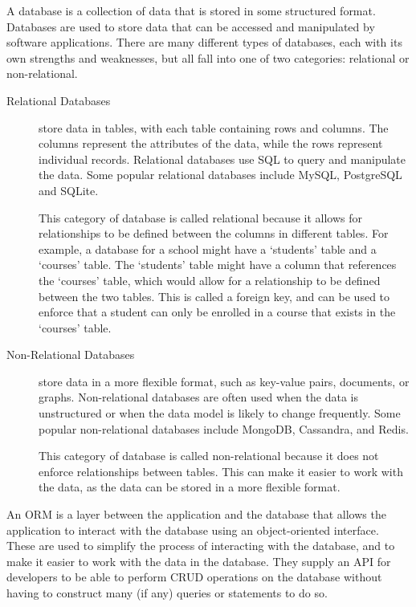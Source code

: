 \documentclass[11pt, a4paper,twoside]{report}
\theoremstyle{plain} %
\theoremstyle{definition} %
\numberwithin{equation}{chapter}
\begin{document}
A database is a collection of data that is stored in some structured
format. Databases are used to store data that can be accessed and
manipulated by software applications. There are many different types of
databases, each with its own strengths and weaknesses, but all fall into
one of two categories: relational or non-relational.

\begin{description}

    \item[Relational Databases] {
        store data in tables, with each table containing rows and columns. The
        columns represent the attributes of the data, while the rows represent
        individual records. Relational databases use SQL to query and
        manipulate the data. Some popular relational databases include MySQL,
        PostgreSQL and SQLite.

        This category of database is called relational because it allows for
        relationships to be defined between the columns in different tables.
        For example, a database for a school might have a `students' table and
        a `courses' table. The `students' table might have a column that
        references the `courses' table, which would allow for a relationship
        to be defined between the two tables. This is called a foreign key, and
        can be used to enforce that a student can only be enrolled in a course
        that exists in the `courses' table.
        }

    \item[Non-Relational Databases] {
        store data in a more flexible format, such as key-value pairs,
        documents, or graphs. Non-relational databases are often used when the
        data is unstructured or when the data model is likely to change
        frequently. Some popular non-relational databases include MongoDB,
        Cassandra, and Redis.

        This category of database is called non-relational because it does not
        enforce relationships between tables. This can make it easier to work
        with the data, as the data can be stored in a more flexible format.

        }

\end{description}

An ORM is a layer between the application and the database that allows the
application to interact with the database using an object-oriented interface.
These are used to simplify the process of interacting with the database, and
to make it easier to work with the data in the database. They supply an API for
developers to be able to perform CRUD operations on the database without having
to construct many (if any) queries or statements to do so.
\end{document}
